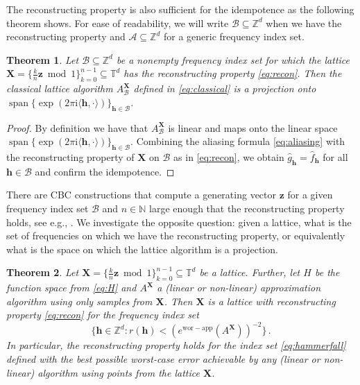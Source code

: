 \documentclass[a4paper]{amsart}
\newtheorem{theorem}{Theorem}[section]
\renewcommand{\hat}{\widehat}
\DeclareMathOperator{\Span}{span}
\newcommand{\ewc}{e^{\mathrm{wor-app}}}
\newcommand{\modone}{\bmod{}1}
\begin{document}
The reconstructing property is also sufficient for the idempotence as the following theorem shows.
For ease of readability, we will write $\mathcal B\subseteq\mathds Z^d$ when we have the reconstructing property and $\mathcal A\subseteq\mathds Z^d$ for a generic frequency index set.

\begin{theorem} Let $\mathcal B\subseteq\mathds Z^d$ be a nonempty frequency index set for which the lattice $\bm X = \{\frac kn\bm z\modone\}_{k=0}^{n-1} \subseteq\mathds T^d$ has the reconstructing property \eqref{eq:recon}.
    Then the classical lattice algorithm $A_{\mathcal B}^{\bm X}$ defined in \eqref{eq:classical} is a projection onto $\Span\{\exp(2\pi\mathrm i\langle\bm h,\cdot\rangle)\}_{\bm h\in\mathcal B}$.
\end{theorem} 

\begin{proof} By definition we have that $A_{\mathcal B}^{\bm X}$ is linear and maps onto the linear space $\Span\{\exp(2\pi\mathrm i\langle\bm h,\cdot\rangle)\}_{\bm h\in\mathcal B}$.
    Combining the aliasing formula \eqref{eq:aliasing} with the reconstructing property of $\bm X$ on $\mathcal B$ as in \eqref{eq:recon}, we obtain $\hat g_{\bm h} = \hat f_{\bm h}$ for all $\bm h\in\mathcal B$ and confirm the idempotence.
\end{proof} 

There are CBC constructions that compute a generating vector $\bm z$ for a given frequency index set $\mathcal B$ and $n\in\mathds N$ large enough that the reconstructing property holds, see e.g., \cite{kaemmerer14, kaemmerer20}.
We investigate the opposite question: given a lattice, what is the set of frequencies on which we have the reconstructing property, or equivalently what is the space on which the lattice algorithm is a projection.

\begin{theorem}\label{recon} Let $\bm X = \{\frac kn \bm z\modone\}_{k=0}^{n-1}\subseteq\mathds T^d$ be a lattice.
    Further, let $H$ be the function space from \eqref{eq:H} and $A^{\bm X}$ a (linear or non-linear) approximation algorithm using only samples from $\bm X$.
    Then $\bm X$ is a lattice with reconstructing property \eqref{eq:recon} for the frequency index set
    \begin{equation}\label{eq:hammerfall}
        \Big\{\bm h\in\mathds Z^d : r(\bm h) < (\ewc(A^{\bm X}))^{-2} \Big\} \,.
    \end{equation}
    In particular, the reconstructing property holds for the index set \eqref{eq:hammerfall} defined with the
    best possible worst-case error achievable by any (linear or non-linear) algorithm using points from the lattice $\bm X$.
\end{theorem} 
\end{document}
